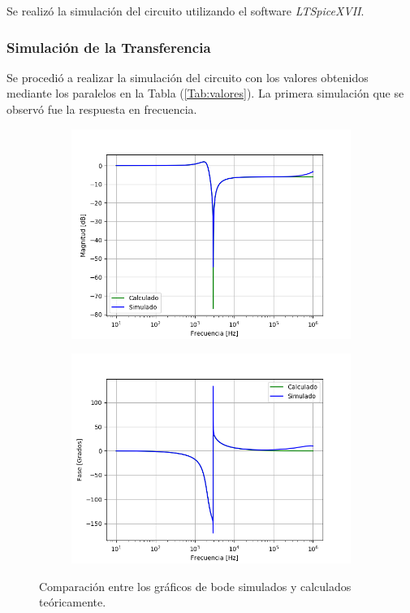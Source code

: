 \documentclass[a4paper]{article}
\begin{document}
Se realizó la simulación del circuito utilizando el software \textit{LTSpiceXVII}.

\subsubsection{Simulación de la Transferencia}

Se procedió a realizar la simulación del circuito con los valores obtenidos mediante los paralelos en la Tabla (\ref{Tab:valores}). La primera simulación que se observó fue la respuesta en frecuencia.

\begin{figure}[H]
	\centering
	\begin{subfigure}[t]{0.49\textwidth}
	\hspace*{-2cm}
	\centering
		\includegraphics[width=1.3\textwidth]{Imagenes/bodemag_calc_sim.png}
	\end{subfigure}
	\begin{subfigure}[t]{0.49\textwidth}
	\centering
		\includegraphics[width=1.3\textwidth]{Imagenes/bodefase_calc_sim.png}
	\end{subfigure}
	\caption{Comparación entre los gráficos de bode simulados y calculados teóricamente.}
	\label{fig:bode_calc_sim}
\end{figure}
\end{document}
